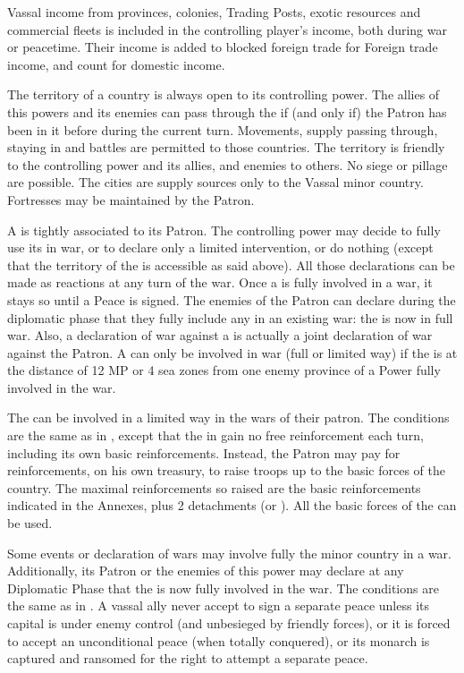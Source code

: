 \aparag[Income] Vassal income from provinces, colonies, Trading Posts, exotic
resources and commercial fleets is included in the controlling player's
income, both during war or peacetime.
\bparag Their income is added to blocked foreign trade for Foreign trade
income, and count for domestic income.

\aparag The territory of a \VASSAL country is always open to its controlling
power. The allies of this powers and its enemies can pass through the \VASSAL
if (and only if) the Patron has been in it before during the current turn.
\bparag Movements, supply passing through, staying in and battles are
permitted to those countries. The territory is friendly to the controlling
power and its allies, and enemies to others.
\bparag No siege or pillage are possible. The cities are supply sources only
to the Vassal minor country.
\bparag Fortresses may be maintained by the Patron.

\aparag[Alliance.] A \VASSAL is tightly associated to its Patron.
\bparag The controlling power may decide to fully use its \VASSAL in war, or
to declare only a limited intervention, or do nothing (except that the
territory of the \VASSAL is accessible as said above). All those declarations
can be made as reactions at any turn of the war. Once a \VASSAL is fully
involved in a war, it stays so until a Peace is signed.
\bparag The enemies of the Patron can declare during the diplomatic phase that
they fully include any \VASSAL in an existing war: the \VASSAL is now in full
war.  Also, a declaration of war against a \VASSAL is actually a joint
declaration of war against the Patron.
\bparag A \VASSAL can only be involved in war (full or limited way) if the
\VASSAL is at the distance of 12 MP or 4 sea zones from one enemy province of
a Power fully involved in the war.

 The \VASSAL can be involved in a
limited way in the wars of their patron. The conditions are the same as in
\AM, except that the \MIN in \VASSAL gain no free reinforcement each turn,
including its own basic reinforcements.
\bparag Instead, the Patron may pay for reinforcements, on his own treasury,
to raise troops up to the basic forces of the country.  The maximal
reinforcements so raised are the basic reinforcements indicated in the
Annexes, plus 2 detachments (\LD or \ND).
\bparag All the basic forces of the \MIN can be used.

 Some events or declaration of wars may
involve fully the minor country in a war.  Additionally, its Patron or the
enemies of this power may declare at any Diplomatic Phase that the \VASSAL is
now fully involved in the war.
\bparag The conditions are the same as in \EW.
 A vassal ally never accept to sign a
separate peace unless its capital is under enemy control (and unbesieged by
friendly forces), or it is forced to accept an unconditional peace (when
totally conquered), or its monarch is captured and ransomed for the right to
attempt a separate peace.


